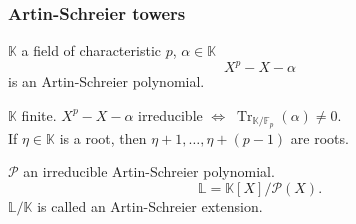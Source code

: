 \documentclass[10pt]{beamer}
\newcommand{\K}{\mathbb{K}}  %
\newcommand{\LK}{\mathbb{L}}  %
\newcommand{\F}{\mathbb{F}}  %
\DeclareMathOperator{\Tr}{Tr}  %
\newcommand{\AS}[1]{\mathcal{#1}}  %
\newcommand{\0}{\mathcal{O}}  %
\begin{document}

\begin{frame}
  \frametitle{Artin-Schreier towers}

  \begin{definition}
    $\K$ a field of characteristic $p$, $\alpha\in\K$
    \[X^p - X - \alpha\]
    is an Artin-Schreier polynomial.
  \end{definition}
  
  \begin{theorem}
    $\K$ finite. $X^p - X - \alpha$ irreducible $\Leftrightarrow \;
    \Tr_{\K/\F_p}(\alpha) \ne 0$.\\ If $\eta\in\K$ is a root, then $\eta
    + 1, \ldots, \eta + (p-1)$ are roots.
  \end{theorem}
  
  \begin{definition}
    $\AS{P}$ an irreducible Artin-Schreier polynomial. 
    \[\LK = \K[X]/\AS{P}(X) \text{.}\]
    $\LK/\K$ is called an Artin-Schreier extension.
  \end{definition}
\end{frame}

\end{document}
